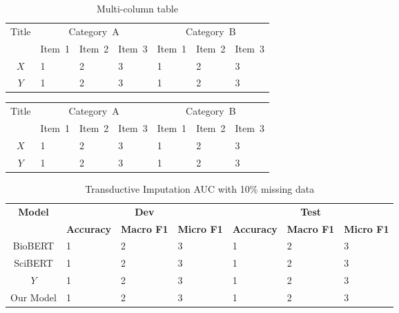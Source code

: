 \begin{table}[ht]
	\caption{Multi-column table}
	\begin{center}
	
	\begin{tabular}{|c||l|l|l||l|l|l|}
		\hline
		\multirow{2}{*}{Title} 
		& \multicolumn{3}{c||}{Category~A} 
		& \multicolumn{3}{|c|}{Category~B} \\             \cline{2-7}
		& Item~1 & Item~2 & Item~3 & Item~1 & Item~2 & Item~3 \\  \hline
		$X$ & 1 & 2 & 3 & 1 & 2 & 3 \\      \hline
		$Y$ & 1 & 2 & 3 & 1 & 2 & 3 \\      \hline
	\end{tabular}
	\end{center}
	\label{tab:multicol}
\end{table}


\begin{tabular}{|c||l|l|l||l|l|l|}
	\hline
	\multirow{2}{*}{Title} 
	& \multicolumn{3}{c||}{Category~A} 
	& \multicolumn{3}{|c|}{Category~B} \\             \cline{2-7}
	& Item~1 & Item~2 & Item~3 & Item~1 & Item~2 & Item~3 \\  \hline
	$X$ & 1 & 2 & 3 & 1 & 2 & 3 \\      \hline
	$Y$ & 1 & 2 & 3 & 1 & 2 & 3 \\      \hline
\end{tabular}


\begin{table*}[t]
	\caption{Transductive Imputation AUC with 10\% missing data}
	\centering
	\label{10perc}
	\begin{small}
			\begin{tabular}{cllllll}
				\toprule
				\multirow{2}{*}{\textbf{Model}} 
				& \multicolumn{3}{c}{\textbf{Dev}} 
				& \multicolumn{3}{c}{\textbf{Test}} \\             
				& \textbf{Accuracy} & \textbf{Macro F1} & \textbf{Micro F1} & \textbf{Accuracy}&  \textbf{Macro F1} & \textbf{Micro F1} \\  
				\midrule
				BioBERT & 1 & 2 & 3 & 1 & 2 & 3 \\      
				SciBERT & 1 & 2 & 3 & 1 & 2 & 3 \\ 
				$Y$ & 1 & 2 & 3 & 1 & 2 & 3 \\ 
				Our Model & 1 & 2 & 3 & 1 & 2 & 3 \\ 
				\bottomrule    
			\end{tabular}
		
	\end{small}
\end{table*}